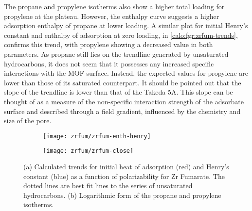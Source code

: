 The propane and propylene isotherms also show a higher total
loading for propylene at the plateau. However, the enthalpy
curve suggests a higher adsorption enthalpy of propane at lower
loading. A similar plot for initial Henry's constant and
enthalpy of adsorption at zero loading, in \autoref{calo:fgr:zrfum-trends},
confirms this trend, with propylene showing a decreased value
in both parameters. As propane still lies on the trendline generated
by unsaturated hydrocarbons, it does not seem that it possesses any
increased specific interactions with the MOF surface. Instead, 
the expected values for propylene are lower than those of its
saturated counterpart. It should be pointed out that the
slope of the trendline is lower than that of the Takeda 5A. This slope 
can be thought of as a measure of the non-specific interaction strength
of the adsorbate surface and described through a field gradient,
influenced by the chemistry and size of the pore.

\begin{figure}[htb]
    \centering
    
    \begin{subfigure}[b]{0.5\textwidth}
        \centering
        \texttt{[image: zrfum/zrfum-enth-henry]}
        \caption{}%
        \label{calo:fgr:zrfum-trends}
    \end{subfigure}%
    \begin{subfigure}[b]{0.45\textwidth}
        \centering
        \texttt{[image: zrfum/zrfum-close]}
        \caption{}%
        \label{calo:fgr:zrfum-close}
    \end{subfigure}%
    \caption{(a) Calculated trends for initial heat of adsorption (red) and 
    Henry's constant (blue) as a function of polarizability for 
    Zr Fumarate. The dotted lines are best fit lines to 
    the series of unsaturated hydrocarbons. (b) Logarithmic form of the 
    propane and propylene isotherms.}%
    \label{calo:fgr:zrfum-analysis}

\end{figure}

